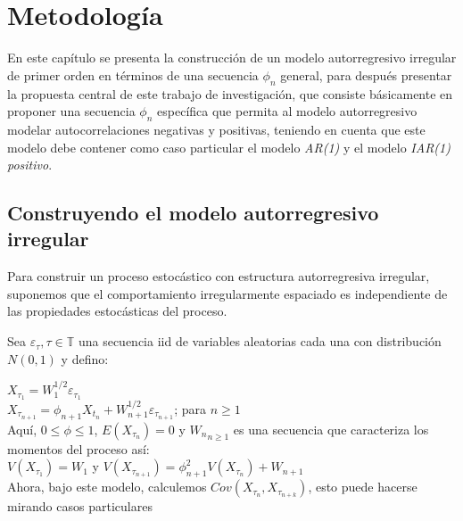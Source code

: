 \chapter{Metodología}

En este capítulo se presenta la construcción de un modelo autorregresivo irregular de primer orden en términos
 de una secuencia $\phi_{n}$ general, para después presentar la propuesta central
de este trabajo de investigación, que consiste básicamente en proponer una secuencia $\phi_{n}$ específica que permita
al modelo autorregresivo modelar autocorrelaciones negativas y positivas, teniendo en cuenta que este modelo
debe contener como caso particular el modelo \emph{AR(1)} y el modelo \emph{IAR(1) positivo}.

\section{Construyendo el modelo autorregresivo irregular}

Para construir un proceso estocástico con estructura autorregresiva irregular, suponemos que el comportamiento irregularmente espaciado es independiente de las propiedades estocásticas del proceso.

Sea ${\varepsilon_{\tau}, \tau \in \mathbb{T}}$ una secuencia iid de variables aleatorias cada una con distribución $N(0,1)$ y defino:

$X_{\tau_{1}} = W_1^{1/2} \varepsilon_{\tau_{1}}$\\
$X_{\tau_{n+1}} = \phi_{n+1} X_{t_n} +W_{n+1}^{1/2}\varepsilon_{\tau_{n+1}}$;    para $n \geq 1$\\

Aquí, $0 \leq \phi \leq 1$, $E(X_{\tau_{n}}) = 0$ y ${W_{n}}_{n\geq 1}$ es una secuencia que caracteriza los momentos del proceso así:\\

$V(X_{\tau_{1}})= W_1$ y $V(X_{\tau_{n+1}}) = \phi_{n+1}^{2}V(X_{\tau_{n}}) + W_{n+1}$\\

Ahora, bajo este modelo, calculemos $Cov(X_{\tau_{n}}, X_{\tau_{n+k}})$, esto puede hacerse mirando casos particulares

